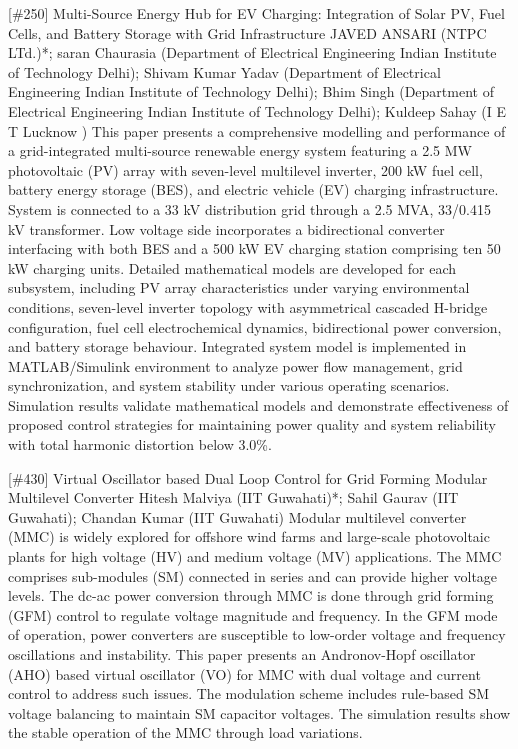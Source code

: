 {} \begin{abstract_online} {[\#250] Multi-Source Energy Hub for EV Charging: Integration of Solar PV, Fuel Cells, and Battery Storage with Grid Infrastructure} {} {JAVED ANSARI (NTPC LTd.)*; saran Chaurasia (Department of Electrical Engineering Indian Institute of Technology Delhi); Shivam Kumar  Yadav (Department of Electrical Engineering Indian Institute of Technology Delhi); Bhim Singh (Department of Electrical Engineering Indian Institute of Technology Delhi); Kuldeep  Sahay (I E T Lucknow )} {} This paper presents a comprehensive modelling and performance of a grid-integrated multi-source renewable energy system featuring a 2.5 MW photovoltaic (PV) array with seven-level multilevel inverter, 200 kW fuel cell, battery energy storage (BES), and electric vehicle (EV) charging infrastructure. System is connected to a 33 kV distribution grid through a 2.5 MVA, 33/0.415 kV transformer. Low voltage side incorporates a bidirectional converter interfacing with both BES and a 500 kW EV charging station comprising ten 50 kW charging units. Detailed mathematical models are developed for each subsystem, including PV array characteristics under varying environmental conditions, seven-level inverter topology with asymmetrical cascaded H-bridge configuration, fuel cell electrochemical dynamics, bidirectional power conversion, and battery storage behaviour. Integrated system model is implemented in MATLAB/Simulink environment to analyze power flow management, grid synchronization, and system stability under various operating scenarios. Simulation results validate mathematical models and demonstrate effectiveness of proposed control strategies for maintaining power quality and system reliability with total harmonic distortion below 3.0\%. \end{abstract_online} 
{} \begin{abstract_online} {[\#430] Virtual Oscillator based Dual Loop Control for Grid Forming Modular Multilevel Converter} {} {Hitesh Malviya (IIT Guwahati)*; Sahil Gaurav (IIT Guwahati); Chandan Kumar (IIT Guwahati)} {} Modular multilevel converter (MMC) is widely explored for offshore wind farms and large-scale photovoltaic plants for high voltage (HV) and medium voltage (MV) applications. The MMC comprises sub-modules (SM) connected in series and can provide higher voltage levels. The dc-ac power conversion through MMC is done through grid forming (GFM) control to regulate voltage magnitude and frequency. In the GFM mode of operation, power converters are susceptible to low-order voltage and frequency oscillations and instability. This paper presents an Andronov-Hopf oscillator (AHO) based virtual oscillator (VO) for MMC with dual voltage and current control to address such issues. The modulation scheme includes rule-based SM voltage balancing to maintain SM capacitor voltages. The simulation results show the stable operation of the MMC through load variations. \end{abstract_online} 
